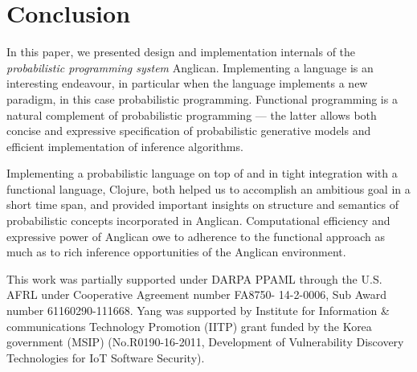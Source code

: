 \documentclass[preprint]{sigplanconf}
\begin{document}
\section{Conclusion}
\label{seq:summary}

In this paper, we presented design and implementation internals
of the \emph{probabilistic programming system} Anglican. Implementing
a language is an interesting endeavour, in particular when the
language implements a new paradigm, in this case probabilistic
programming. Functional programming is a natural complement of
probabilistic programming --- the latter allows both concise and
expressive specification of probabilistic generative models and
efficient implementation of inference algorithms.

Implementing a probabilistic language on top of and in tight
integration with a functional language, Clojure, both helped
us to accomplish an ambitious goal in a short time span, and
provided important insights on structure and semantics of
probabilistic concepts incorporated in Anglican. Computational
efficiency and expressive power of Anglican owe to adherence to
the functional approach as much as to rich inference
opportunities of the Anglican environment.

\acks

This work was partially supported under DARPA PPAML through the
U.S. AFRL under Cooperative Agreement number FA8750- 14-2-0006,
Sub Award number 61160290-111668. Yang was supported by Institute for 
Information \& communications Technology Promotion (IITP) grant funded 
by the Korea government (MSIP) (No.R0190-16-2011, Development of 
Vulnerability Discovery Technologies for IoT Software Security).





\end{document}
